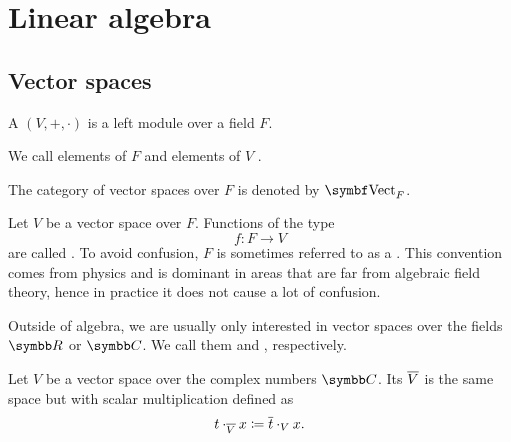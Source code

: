 \section{Linear algebra}\label{sec:linear_algebra}
\subsection{Vector spaces}\label{subsec:vector_spaces}

\begin{definition}\label{def:vector_space}
  A  \( (V, +, \cdot) \) is a left module over a field \( F \).

  We call elements of \( F \)  and elements of \( V \) .

  The category of vector spaces over \( F \) is denoted by \( \Cat{Vect}_F \).
\end{definition}

\begin{definition}\label{def:vector_field}
  Let \( V \) be a vector space over \( F \). Functions of the type
  \begin{equation*}
    f: F \to V
  \end{equation*}
  are called . To avoid confusion, \( F \) is sometimes referred to as a . This convention comes from physics and is dominant in areas that are far from algebraic field theory, hence in practice it does not cause a lot of confusion.
\end{definition}

\begin{remark}\label{remark:real_vector_space}
  Outside of algebra, we are usually only interested in vector spaces over the fields \( \R \) or \( \BB{C} \). We call them  and , respectively.
\end{remark}

\begin{definition}\label{def:complex_conjucate_vector_space}
  Let \( V \) be a vector space over the complex numbers \( \BB{C} \). Its  \( \overline{V} \) is the same space but with scalar multiplication defined as
  \begin{equation*}
    t \cdot_{\overline{V}} x \coloneqq \overline{t} \cdot_V x.
  \end{equation*}
\end{definition}

